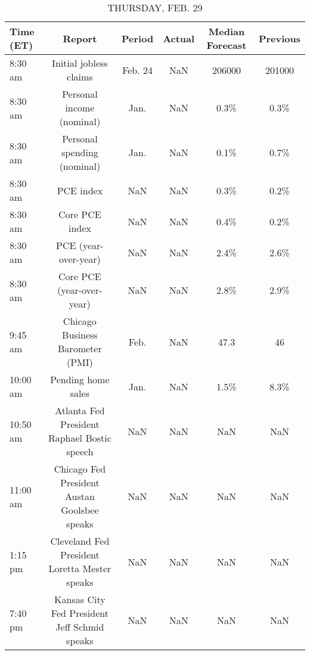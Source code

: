 \documentclass{article}%
\begin{document}
\begin{table}[htbp]%
\caption{THURSDAY, FEB. 29}%
\centering%
\begin{adjustbox}{width=1\textwidth}%
\begin{tabular}{lccccc}
\toprule
Time (ET) &                                        Report &  Period & Actual & Median Forecast & Previous \\
\midrule
  8:30 am &                        Initial jobless claims & Feb. 24 &    NaN &          206000 &   201000 \\
  8:30 am &                     Personal income (nominal) &    Jan. &    NaN &            0.3\% &     0.3\% \\
  8:30 am &                   Personal spending (nominal) &    Jan. &    NaN &            0.1\% &     0.7\% \\
  8:30 am &                                     PCE index &     NaN &    NaN &            0.3\% &     0.2\% \\
  8:30 am &                                Core PCE index &     NaN &    NaN &            0.4\% &     0.2\% \\
  8:30 am &                          PCE (year-over-year) &     NaN &    NaN &            2.4\% &     2.6\% \\
  8:30 am &                     Core PCE (year-over-year) &     NaN &    NaN &            2.8\% &     2.9\% \\
  9:45 am &              Chicago Business Barometer (PMI) &    Feb. &    NaN &            47.3 &       46 \\
 10:00 am &                            Pending home sales &    Jan. &    NaN &            1.5\% &     8.3\% \\
 10:50 am &   Atlanta Fed President Raphael Bostic speech &     NaN &    NaN &             NaN &      NaN \\
 11:00 am &  Chicago Fed President Austan Goolsbee speaks &     NaN &    NaN &             NaN &      NaN \\
  1:15 pm & Cleveland Fed President Loretta Mester speaks &     NaN &    NaN &             NaN &      NaN \\
  7:40 pm &  Kansas City Fed President Jeff Schmid speaks &     NaN &    NaN &             NaN &      NaN \\
\bottomrule
\end{tabular}
%
\end{adjustbox}%
\end{table}

%
\end{document}
